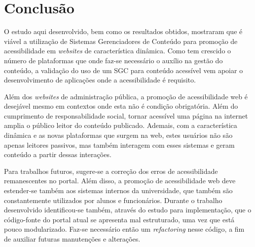 \chapter*[Conclusão]{Conclusão}

O estudo aqui desenvolvido, bem como os resultados obtidos, mostraram que é viável a utilização de Sistemas Gerenciadores de Conteúdo para promoção de acessibilidade em \textit{websites} de característica dinâmica. Como tem crescido o número de plataformas que onde faz-se necessário o auxílio na gestão do conteúdo, a validação do uso de um SGC para conteúdo acessível vem apoiar o desenvolvimento de aplicações onde a acessibilidade é requisito. 

Além dos \textit{websites} de administração pública, a promoção de acessibilidade web é desejável mesmo em contextos onde esta não é condição obrigatória. Além do cumprimento de responsabilidade social, tornar acessível uma página na internet amplia o público leitor do conteúdo publicado. Ademais, com a característica dinâmica e as novas plataformas que surgem na web, estes usuários não são apenas leitores passivos, mas também interagem com esses sistemas e geram conteúdo a partir dessas interações.

Para trabalhos futuros, sugere-se a correção dos erros de acessibilidade remanescentes no portal. Além disso, a promoção de acessibilidade web deve estender-se também aos sistemas internos da universidade, que também são constantemente utilizados por alunos e funcionários. Durante o trabalho desenvolvido identificou-se também, através do estudo para implementação, que o código-fonte do portal atual se apresenta mal estruturado, uma vez que está pouco modularizado. Faz-se necessário então um \textit{refactoring} nesse código, a fim de auxiliar futuras manutenções e alterações.